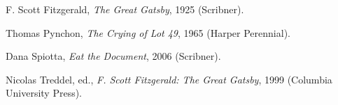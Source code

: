 \begin{description}

  \item F. Scott Fitzgerald, \textit{The Great Gatsby}, 1925 (Scribner).
  \item Thomas Pynchon, \textit{The Crying of Lot 49}, 1965 (Harper Perennial).
  \item Dana Spiotta, \textit{Eat the Document}, 2006 (Scribner).
  \item Nicolas Treddel, ed., \textit{F. Scott Fitzgerald: The Great Gatsby}, 1999 (Columbia University Press).

\end{description}
